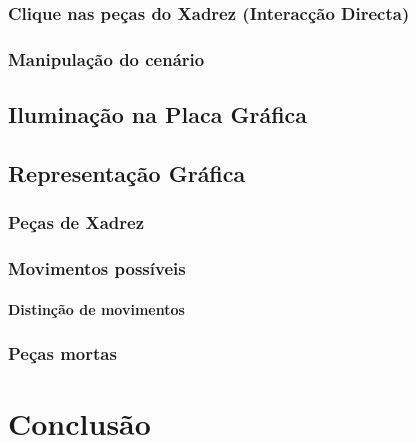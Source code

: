 \documentclass[11pt,a4paper]{report}
\begin{document}
\subsection{Clique nas peças do Xadrez (Interacção Directa)}

\subsection{Manipulação do cenário}

\section{Iluminação na Placa Gráfica}

\section{Representação Gráfica}

\subsection{Peças de Xadrez}

\subsection{Movimentos possíveis}

\subsubsection{Distinção de movimentos}

\subsection{Peças mortas}



\chapter{Conclusão}
%




%
%

\listoffigures

\end{document}
